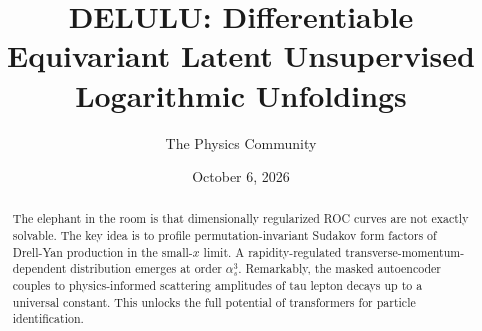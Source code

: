\documentclass[11pt]{article}
\title{DELULU: Differentiable Equivariant Latent Unsupervised Logarithmic Unfoldings}
\author{The Physics Community}
\date{October 6, 2026}
\begin{document}
\maketitle
\begin{abstract}
The elephant in the room is that dimensionally regularized ROC curves
are not exactly solvable. The key idea is to profile
permutation-invariant Sudakov form factors of Drell-Yan production in
the small-$x$ limit. A rapidity-regulated transverse-momentum-dependent
distribution emerges at order $\alpha_s^3$. Remarkably, the masked
autoencoder couples to physics-informed scattering amplitudes of tau
lepton decays up to a universal constant. This unlocks the full
potential of transformers for particle identification.
\end{abstract}
\tableofcontents





\nocite{*}


\end{document}
